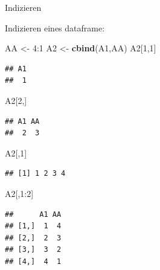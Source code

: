 \documentclass[
  ignorenonframetext,
]{beamer}
\newenvironment{Shaded}{\begin{snugshade}}{\end{snugshade}}
\newcommand{\DecValTok}[1]{\textcolor[rgb]{0.27,0.67,0.26}{#1}}
\newcommand{\KeywordTok}[1]{\textcolor[rgb]{0.26,0.66,0.93}{\textbf{#1}}}
\newcommand{\NormalTok}[1]{\textcolor[rgb]{0.74,0.68,0.62}{#1}}
\newcommand{\OperatorTok}[1]{\textcolor[rgb]{0.74,0.68,0.62}{#1}}
\newcommand{\StringTok}[1]{\textcolor[rgb]{0.02,0.61,0.04}{#1}}
\begin{document}
\begin{frame}[fragile]{Indizieren}
\protect\hypertarget{indizieren}{}

Indizieren eines dataframe:

\begin{Shaded}
\begin{Highlighting}[]
\NormalTok{AA <-}\StringTok{ }\DecValTok{4}\OperatorTok{:}\DecValTok{1}
\NormalTok{A2 <-}\StringTok{ }\KeywordTok{cbind}\NormalTok{(A1,AA)}
\NormalTok{A2[}\DecValTok{1}\NormalTok{,}\DecValTok{1}\NormalTok{]}
\end{Highlighting}
\end{Shaded}

\begin{verbatim}
## A1 
##  1
\end{verbatim}

\begin{Shaded}
\begin{Highlighting}[]
\NormalTok{A2[}\DecValTok{2}\NormalTok{,]}
\end{Highlighting}
\end{Shaded}

\begin{verbatim}
## A1 AA 
##  2  3
\end{verbatim}

\begin{Shaded}
\begin{Highlighting}[]
\NormalTok{A2[,}\DecValTok{1}\NormalTok{]}
\end{Highlighting}
\end{Shaded}

\begin{verbatim}
## [1] 1 2 3 4
\end{verbatim}

\begin{Shaded}
\begin{Highlighting}[]
\NormalTok{A2[,}\DecValTok{1}\OperatorTok{:}\DecValTok{2}\NormalTok{]}
\end{Highlighting}
\end{Shaded}

\begin{verbatim}
##      A1 AA
## [1,]  1  4
## [2,]  2  3
## [3,]  3  2
## [4,]  4  1
\end{verbatim}

\end{frame}
\end{document}
